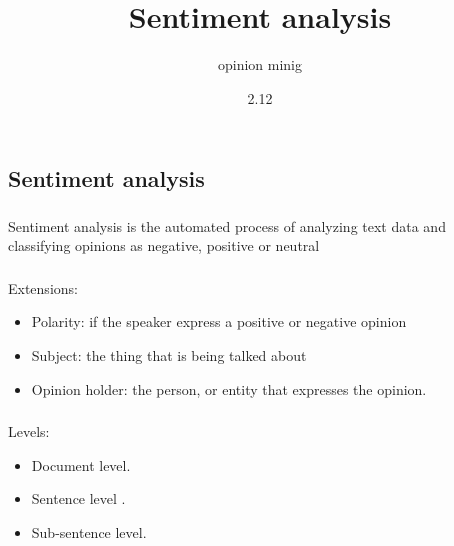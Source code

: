 \documentclass[t, 11pt]{beamer}
\title{Sentiment analysis}
\subtitle{opinion minig}
\date{2.12}
\institute{<<Высшая школа экономики>>}
\begin{document}
	\frame[plain]{\titlepage}
%	
%			 
%	

\subsection{Sentiment analysis}
\begin{frame}
	\frametitle{\insertsection}
	\frametitle{\insertsubsection}  
	Sentiment analysis is the automated process of analyzing text data and classifying opinions as negative, positive or neutral
\end{frame}


\begin{frame}
	\frametitle{\insertsection}
	\frametitle{\insertsubsection}  
	Extensions:
	\begin{itemize}
		\item Polarity: if the speaker express a positive or negative opinion
		\item Subject: the thing that is being talked about
		\item Opinion holder: the person, or entity that expresses the opinion.
	\end{itemize}
\end{frame}


\begin{frame}
	\frametitle{\insertsection}
	\frametitle{\insertsubsection} 
	Levels: 
	\begin{itemize}
	\item Document level.
	\item Sentence level .
	\item Sub-sentence level.
\end{itemize}
\end{frame}
\end{document}
